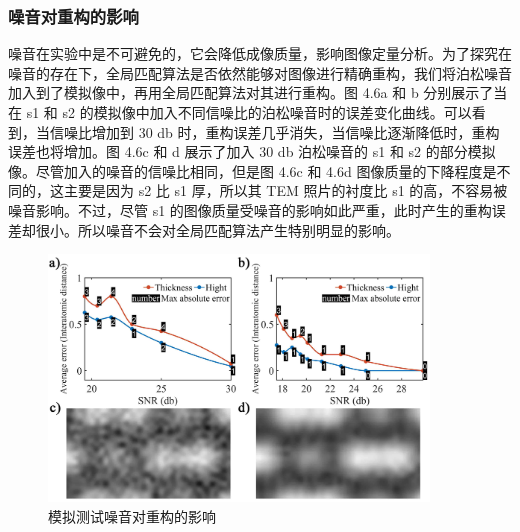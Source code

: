 \subsubsection{噪音对重构的影响}

噪音在实验中是不可避免的，它会降低成像质量，影响图像定量分析。为了探究在噪音的存在下，全局匹配算法是否依然能够对图像进行精确重构，我们将泊松噪音加入到了模拟像中，再用全局匹配算法对其进行重构。图 4.6a 和 b 分别展示了当在 s1 和 s2 的模拟像中加入不同信噪比的泊松噪音时的误差变化曲线。可以看到，当信噪比增加到 30 db 时，重构误差几乎消失，当信噪比逐渐降低时，重构误差也将增加。图 4.6c 和 d 展示了加入 30 db 泊松噪音的 s1 和 s2 的部分模拟像。尽管加入的噪音的信噪比相同，但是图 4.6c 和 4.6d 图像质量的下降程度是不同的，这主要是因为 s2 比 s1 厚，所以其 TEM 照片的衬度比 s1 的高，不容易被噪音影响。不过，尽管 s1 的图像质量受噪音的影响如此严重，此时产生的重构误差却很小。所以噪音不会对全局匹配算法产生特别明显的影响。

\begin{figure}[htbp]
	\vspace{\baselineskip}
	\centering
	\includegraphics[width=0.9\textwidth]{../2.5/25}
	\caption{模拟测试噪音对重构的影响}\label{fig:25}
	\song{}
\end{figure}

